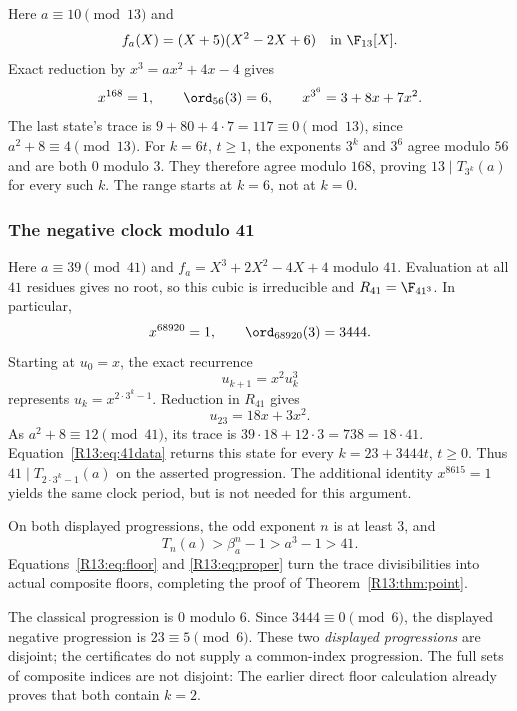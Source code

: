 \documentclass[11pt,a4paper]{article}
\theoremstyle{definition}\newtheorem{definition}[theorem]{Definition}
\theoremstyle{remark}\newtheorem{remark}[theorem]{Remark}
\begin{document}
Here $a\equiv10\pmod{13}$ and
\[
 f_a(X)=(X+5)(X^2-2X+6)\quad\text{in }\F_{13}[X].
\]
Exact reduction by $x^3=ax^2+4x-4$ gives
\begin{equation}\label{R13:eq:13data}
 x^{168}=1,\qquad \ord_{56}(3)=6,\qquad
 x^{3^6}=3+8x+7x^2.
\end{equation}
The last state's trace is $9+80+4\cdot7=117\equiv0\pmod{13}$,
since $a^2+8\equiv4\pmod{13}$.
For $k=6t$, $t\ge1$, the exponents $3^k$ and $3^6$ agree
modulo $56$ and are both $0$ modulo $3$.
They therefore agree modulo $168$, proving
$13\mid T_{3^k}(a)$ for every such $k$.
The range starts at $k=6$, not at $k=0$.

\subsubsection{The negative clock modulo 41}

Here $a\equiv39\pmod{41}$ and
$f_a=X^3+2X^2-4X+4$ modulo $41$.
Evaluation at all $41$ residues gives no root, so this cubic is
irreducible and $R_{41}=\F_{41^3}$.
In particular,
\begin{equation}\label{R13:eq:41data}
 x^{68920}=1,\qquad \ord_{68920}(3)=3444.
\end{equation}
Starting at $u_0=x$, the exact recurrence
\[
 u_{k+1}=x^2u_k^3
\]
represents $u_k=x^{2\cdot3^k-1}$.
Reduction in $R_{41}$ gives
\[
 u_{23}=18x+3x^2.
\]
As $a^2+8\equiv12\pmod{41}$, its trace is
$39\cdot18+12\cdot3=738=18\cdot41$.
Equation~\eqref{R13:eq:41data} returns this state for every
$k=23+3444t$, $t\ge0$.
Thus $41\mid T_{2\cdot3^k-1}(a)$ on the asserted progression.
The additional identity $x^{8615}=1$ yields the same clock period,
but is not needed for this argument.

On both displayed progressions, the odd exponent $n$ is at least $3$,
and
\begin{equation}\label{R13:eq:proper}
 T_n(a)>\beta_a^n-1>a^3-1>41.
\end{equation}
Equations~\eqref{R13:eq:floor} and \eqref{R13:eq:proper} turn the trace
divisibilities into actual composite floors, completing the proof
of Theorem~\ref{R13:thm:point}.

The classical progression is $0$ modulo $6$.
Since $3444\equiv0\pmod6$, the displayed negative progression is
$23\equiv5\pmod6$. These two \emph{displayed progressions} are disjoint;
the certificates do not supply a common-index progression.
The full sets of composite indices are not disjoint: The earlier direct floor calculation
already proves that both contain $k=2$.
\end{document}
